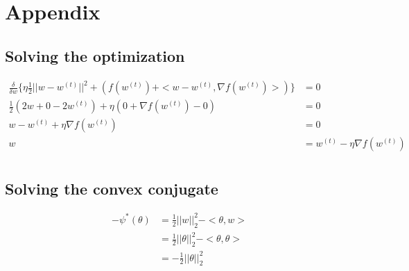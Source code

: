 \documentclass[11pt]{article}
\begin{document}
{


}

\section{Appendix}

\subsection{Solving the optimization}
\label{sec:App Solving the optimization}
\begin{align*}
    \frac{\delta}{\delta w} \{\eta \frac{1}{2} ||w - w^{(t)}||^2 + (f(w^{(t)}) + <w - w^{(t)}, \nabla f(w^{(t)})>) \} &= 0 \\
    \frac{1}{2} (2w + 0 -2w^{(t)}) + \eta (0 + \nabla f(w^{(t)}) - 0) &= 0 \\
    w - w^{(t)} + \eta \nabla f(w^{(t)}) &= 0 \\
    w &= w^{(t)} - \eta \nabla f(w^{(t)}) \\
\end{align*}

\subsection{Solving the convex conjugate}
\label{sec:Solving the convex conjugate}
\begin{equation}
    \begin{split}
        -\psi^*(\theta) &= \frac{1}{2} ||w||^2_2 - <\theta, w > \\
        &= \frac{1}{2} ||\theta||^2_2 - <\theta, \theta> \\
        &= -\frac{1}{2} ||\theta||^2_2
    \end{split}
\end{equation}
\end{document}
